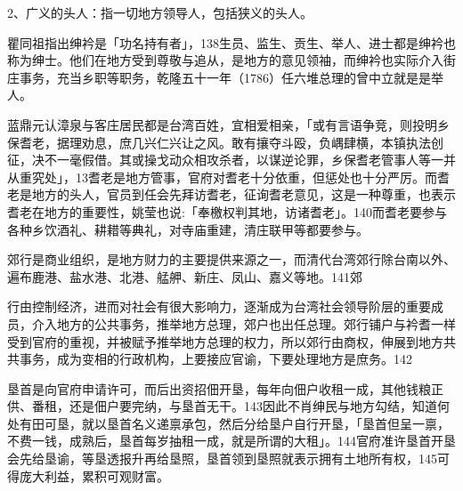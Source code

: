 2、广义的头人：指一切地方领导人，包括狭义的头人。


\noindent 瞿同祖指出绅衿是「功名持有者」，138生员、监生、贡生、举人、进士都是绅衿也称为绅士。他们在地方受到尊敬与追从，是地方的意见领袖，而绅衿也实际介入街庄事务，充当乡职等职务，乾隆五十一年（1786）任六堆总理的曾中立就是是举人。


\noindent 蓝鼎元认漳泉与客庄居民都是台湾百姓，宜相爱相亲，「或有言语争竞，则投明乡保耆老，据理劝息，庶几兴仁兴让之风。敢有攘夺斗殴，负嵎肆横，本镇执法创征，决不一毫假借。其或操戈动众相攻杀者，以谋逆论罪，乡保耆老管事人等一并从重究处」，13耆老是地方管事，官府对耆老十分依重，但惩处也十分严厉。而耆老是地方的头人，官员到任会先拜访耆老，征询耆老意见，这是一种尊重，也表示耆老在地方的重要性，姚莹也说:「奉檄权判其地，访诸耆老」。140而耆老要参与各种乡饮酒礼、耕耤等典礼，对寺庙重建，清庄联甲等都要参与。


\noindent 郊行是商业组织，是地方财力的主要提供来源之一，而清代台湾郊行除台南以外、遍布鹿港、盐水港、北港、艋舺、新庄、凤山、嘉义等地。141郊

\vfill
\begin{BookNotes}
\end{BookNotes}

\noindent 行由控制经济，进而对社会有很大影响力，逐渐成为台湾社会领导阶层的重要成员，介入地方的公共事务，推举地方总理，郊户也出任总理。郊行铺户与衿耆一样受到官府的重视，并被赋予推举地方总理的权力，所以郊行由商权，伸展到地方共共事务，成为变相的行政机构，上要接应官谕，下要处理地方是庶务。142


\noindent 垦首是向官府申请许可，而后出资招佃开垦，每年向佃户收租一成，其他钱粮正供、番租，还是佃户要完纳，与垦首无干。143因此不肖绅民与地方勾结，知道何处有田可垦，就以垦首名义递禀承包，然后分给垦户自行开垦，「垦首但呈一禀，不费一钱，成熟后，垦首每岁抽租一成，就是所谓的大租」。144官府准许垦首开垦会先给垦谕，等垦透报升再给垦照，垦首领到垦照就表示拥有土地所有权，145可得庞大利益，累积可观财富。

